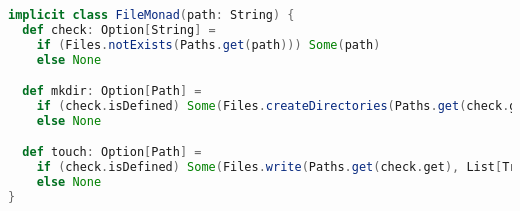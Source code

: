 \begin{lstlisting}[language=Scala, caption=Monade per le operazioni di setup, label=lst:setup]
implicit class FileMonad(path: String) {
  def check: Option[String] =
    if (Files.notExists(Paths.get(path))) Some(path)
    else None

  def mkdir: Option[Path] =
    if (check.isDefined) Some(Files.createDirectories(Paths.get(check.get)))
    else None

  def touch: Option[Path] =
    if (check.isDefined) Some(Files.write(Paths.get(check.get), List[Track]().asJson))
    else None
}
\end{lstlisting}